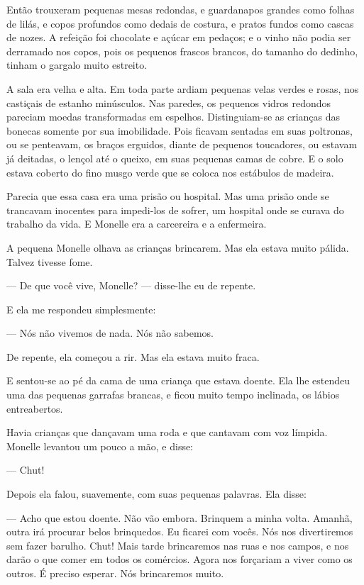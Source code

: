Então trouxeram pequenas mesas redondas, e guardanapos grandes
como folhas de lilás, e copos profundos como dedais de costura, e pratos
fundos como cascas de nozes. A refeição foi chocolate e açúcar em pedaços;
e o vinho não podia ser derramado nos copos, pois os pequenos frascos
brancos, do tamanho do dedinho, tinham o gargalo muito estreito.

A sala era velha e alta. Em toda parte ardiam pequenas velas verdes e
rosas, nos castiçais de estanho minúsculos. Nas paredes, os pequenos
vidros redondos pareciam moedas transformadas em espelhos. Distinguiam-se
as crianças das bonecas somente por sua imobilidade. Pois ficavam sentadas
em suas poltronas, ou se penteavam, os braços erguidos, diante de pequenos
toucadores, ou estavam já deitadas, o lençol até o queixo, em suas
pequenas camas de cobre. E o solo estava coberto do fino musgo verde que
se coloca nos estábulos de madeira.

Parecia que essa casa era uma prisão ou hospital. Mas uma prisão onde
se trancavam inocentes para impedi-los de sofrer, um hospital onde se
curava do trabalho da vida. E Monelle era a carcereira e a enfermeira.

A pequena Monelle olhava as crianças brincarem. Mas ela estava muito
pálida. Talvez tivesse fome.

--- De que você vive, Monelle? --- disse-lhe eu de repente.

E ela me respondeu simplesmente:

--- Nós não vivemos de nada. Nós não sabemos.

De repente, ela começou a rir. Mas ela estava muito fraca.

E sentou-se ao pé da cama de uma criança que estava doente. Ela lhe
estendeu uma das pequenas garrafas brancas, e ficou muito tempo inclinada,
os lábios entreabertos.


Havia crianças que dançavam uma roda e que cantavam com voz límpida.
Monelle levantou um pouco a mão, e disse:

--- Chut!

Depois ela falou, suavemente, com suas pequenas palavras. Ela disse:

--- Acho que estou doente. Não vão embora. Brinquem a minha volta.
Amanhã, outra irá procurar belos brinquedos. Eu ficarei com vocês. Nós nos
divertiremos sem fazer barulho. Chut! Mais tarde brincaremos nas ruas e
nos campos, e nos darão o que comer em todos os comércios. Agora nos
forçariam a viver como os outros. É preciso esperar. Nós brincaremos muito.

